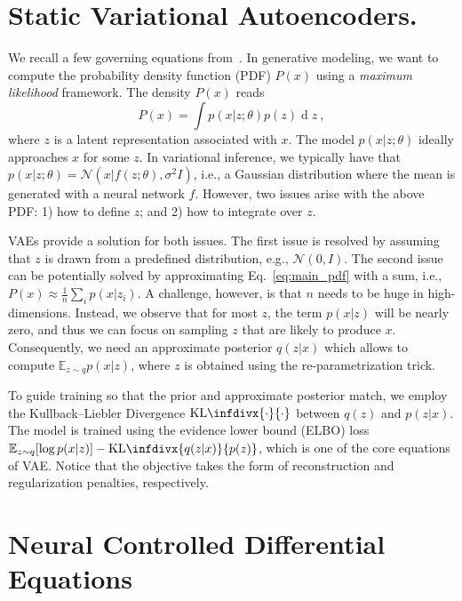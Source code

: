 \documentclass{article} %
\DeclareMathOperator*{\dd}{d}
\newcommand{\kldiv}{\text{KL}\infdivx}
\begin{document}
\clearpage
\appendix


\section{Static Variational Autoencoders.}
\label{app:vae}

We recall a few governing equations from~\citep{kingma14auto, doersch2016tutorial}. In generative modeling, we want to compute the probability density function (PDF) $P(x)$ using a \emph{maximum likelihood} framework. 
The density $P(x)$ reads
\begin{equation} \label{eq:main_pdf}
    P(x) = \int p(x | z; \theta) p(z) \dd z \ ,
\end{equation}
where $z$ is a latent representation associated with $x$. 
The model $p(x | z; \theta)$ ideally approaches $x$ for some $z$. 
In variational inference, we typically have that $p(x | z; \theta) = \mathcal{N}(x | f(z; \theta), \sigma^2 I)$, i.e., a Gaussian distribution where the mean is generated with a neural network $f$. 
However, two issues arise with the above PDF: 1) how to define $z$; and 2) how to integrate over $z$. 

VAEs provide a solution for both issues. 
The first issue is resolved by assuming that $z$ is drawn from a predefined distribution, e.g., $\mathcal{N}(0, I)$. 
The second issue can be potentially solved by approximating Eq.~\ref{eq:main_pdf} with a sum, i.e., $P(x) \approx \frac{1}{n} \sum_i p(x| z_i)$.
A challenge, however, is that $n$ needs to be huge in high-dimensions. 
Instead, we observe that for most $z$, the term $p(x| z)$ will be nearly zero, and thus we can focus on sampling $z$ that are likely to produce $x$. 
Consequently, we need an approximate posterior $q(z | x)$ which allows to compute $\mathbb{E}_{z\sim q} p(x | z)$, where $z$ is obtained using the re-parametrization trick. 

To guide training so that the prior and approximate posterior match, we employ the Kullback--Liebler Divergence $\kldiv{\cdot}{\cdot}$ between $q(z)$ and $p(z|x)$. 
The model is trained using the evidence lower bound (ELBO) loss $\mathbb{E}_{z \sim q}[\log p(x| z)] - \kldiv{q(z|x)}{p(z)}$, which is one of the core equations of VAE. 
Notice that the objective takes the form of reconstruction and regularization penalties, respectively.

\section{Neural Controlled Differential Equations}
\label{app:ncde}
\end{document}
